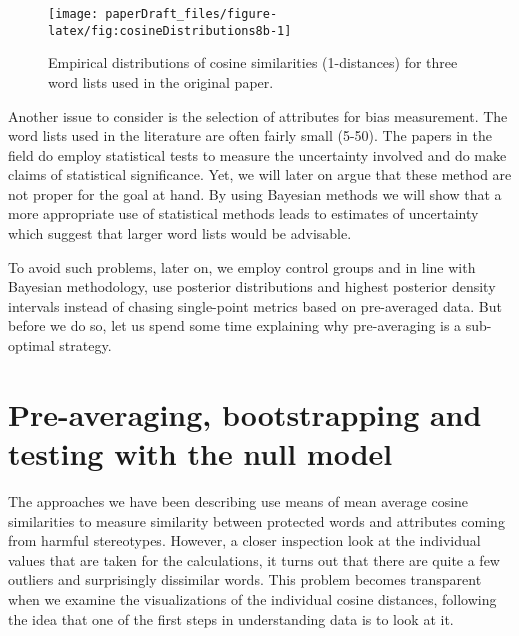 \documentclass[
  12pt,
  dvipsnames,enabledeprecatedfontcommands]{scrartcl}
\begin{document}
\pagebreak

\begin{figure}[H]

\begin{center}\texttt{[image: paperDraft\_files/figure-latex/fig:cosineDistributions8b-1]} \end{center}

\caption{Empirical distributions of cosine similarities (1-distances) for three word lists used in  the original paper.  }

\label{fig:empirical}
\end{figure}

Another issue to consider is the selection of attributes for bias
measurement. The word lists used in the literature are often fairly
small (5-50). The papers in the field do employ statistical tests to
measure the uncertainty involved and do make claims of statistical
significance. Yet, we will later on argue that these method are not
proper for the goal at hand. By using Bayesian methods we will show that
a more appropriate use of statistical methods leads to estimates of
uncertainty which suggest that larger word lists would be advisable.

To avoid such problems, later on, we employ control groups and in line
with Bayesian methodology, use posterior distributions and highest
posterior density intervals instead of chasing single-point metrics
based on pre-averaged data. But before we do so, let us spend some time
explaining why pre-averaging is a sub-optimal strategy.

\hypertarget{pre-averaging-bootstrapping-and-testing-with-the-null-model}{%
\section{Pre-averaging, bootstrapping and testing with the null
model}\label{pre-averaging-bootstrapping-and-testing-with-the-null-model}}

The approaches we have been describing use means of mean average cosine
similarities to measure similarity between protected words and
attributes coming from harmful stereotypes. However, a closer inspection
look at the individual values that are taken for the calculations, it
turns out that there are quite a few outliers and surprisingly
dissimilar words. This problem becomes transparent when we examine the
visualizations of the individual cosine distances, following the idea
that one of the first steps in understanding data is to look at it.
\end{document}
